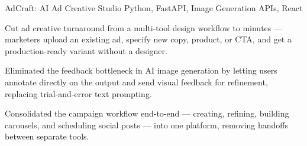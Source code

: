 \resumeSubheading
  {AdCraft: AI Ad Creative Studio}{}
  {Python, FastAPI, Image Generation APIs, React}{}
  \resumeItemListStart
    \item \small{Cut ad creative turnaround from a multi-tool design workflow to minutes --- marketers upload an existing ad, specify new copy, product, or CTA, and get a production-ready variant without a designer.}
    \item \small{Eliminated the feedback bottleneck in AI image generation by letting users annotate directly on the output and send visual feedback for refinement, replacing trial-and-error text prompting.}
    \item \small{Consolidated the campaign workflow end-to-end --- creating, refining, building carousels, and scheduling social posts --- into one platform, removing handoffs between separate tools.}
  \resumeItemListEnd

